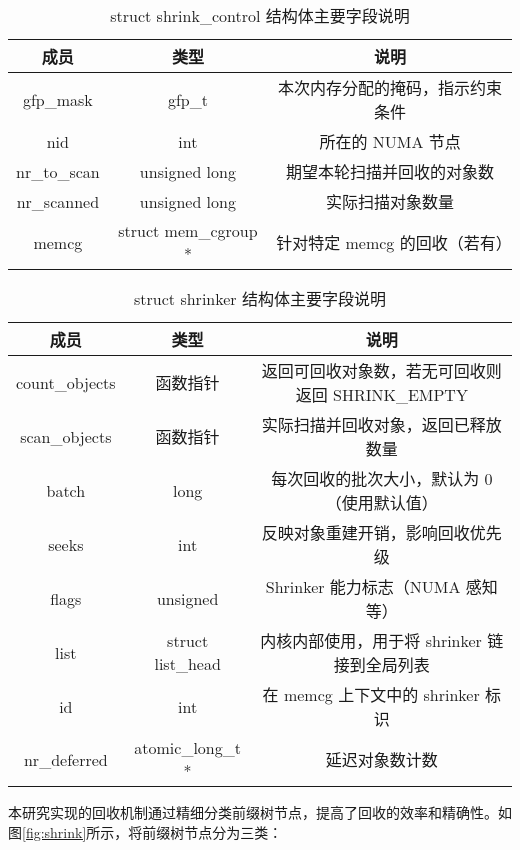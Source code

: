 \begin{table}[htbp]
  \centering
  \caption{struct shrink\_control 结构体主要字段说明}
  \label{tab:shrink_control_struct}
  \begin{tabular}{ccc}
    \toprule
    \textbf{成员} & \textbf{类型} & \textbf{说明} \\
    \midrule
    gfp\_mask & gfp\_t & 本次内存分配的掩码，指示约束条件 \\
    nid & int & 所在的 NUMA 节点 \\
    nr\_to\_scan & unsigned long & 期望本轮扫描并回收的对象数 \\
    nr\_scanned & unsigned long & 实际扫描对象数量 \\
    memcg & struct mem\_cgroup * & 针对特定 memcg 的回收（若有） \\
    \bottomrule
  \end{tabular}
\end{table}

\begin{table}[htbp]
  \centering
  \caption{struct shrinker 结构体主要字段说明}
  \label{tab:shrinker_struct}
  \begin{tabular}{ccc}
    \toprule
    \textbf{成员} & \textbf{类型} & \textbf{说明} \\
    \midrule
    count\_objects & 函数指针 & 返回可回收对象数，若无可回收则返回 SHRINK\_EMPTY \\
    scan\_objects & 函数指针 & 实际扫描并回收对象，返回已释放数量 \\
    batch & long & 每次回收的批次大小，默认为 0（使用默认值） \\
    seeks & int & 反映对象重建开销，影响回收优先级 \\
    flags & unsigned & Shrinker 能力标志（NUMA 感知等） \\
    list & struct list\_head & 内核内部使用，用于将 shrinker 链接到全局列表 \\
    id & int & 在 memcg 上下文中的 shrinker 标识 \\
    nr\_deferred & atomic\_long\_t * & 延迟对象数计数 \\
    \bottomrule
  \end{tabular}
\end{table}

本研究实现的回收机制通过精细分类前缀树节点，提高了回收的效率和精确性。如图\ref{fig:shrink}所示，将前缀树节点分为三类：


